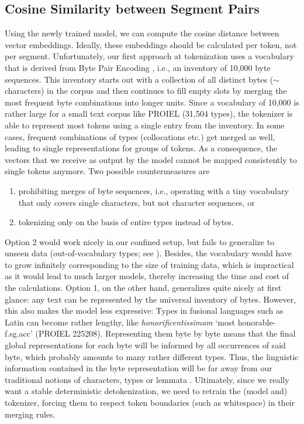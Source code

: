\subsection{Cosine Similarity between Segment Pairs}
Using the newly trained model, we can compute the cosine distance between vector embeddings. Ideally, these embeddings should be calculated per token, not per segment. Unfortunately, our first approach at tokenization uses a vocabulary that is derived from Byte Pair Encoding \parencite[1716]{sennrichNeuralMachineTranslation2016}, i.e., an inventory of 10,000 byte sequences. This inventory starts out with a collection of all distinct bytes ($\sim$ characters) in the corpus and then continues to fill empty slots by merging the most frequent byte combinations into longer units. Since a vocabulary of 10,000 is rather large for a small text corpus like PROIEL (31,504 types), the tokenizer is able to represent most tokens using a single entry from the inventory. In some cases, frequent combinations of types (collocations etc.) get merged as well, leading to single representations for groups of tokens. As a consequence, the vectors that we receive as output by the model cannot be mapped consistently to single tokens anymore. Two possible countermeasures are 
\begin{enumerate}
    \item prohibiting merges of byte sequences, i.e., operating with a tiny vocabulary that only covers single characters, but not character sequences, or
    \item tokenizing only on the basis of entire types instead of bytes.
\end{enumerate}

Option 2 would work nicely in our confined setup, but fails to generalize to unseen data (out-of-vocabulary types; see \cite[57]{paradaSpokenTermDetection2010}). Besides, the vocabulary would have to grow infinitely corresponding to the size of training data, which is impractical as it would lead to much larger models, thereby increasing the time and cost of the calculations. Option 1, on the other hand, generalizes quite nicely at first glance: any text can be represented by the universal inventory of bytes. However, this also makes the model less expressive: Types in fusional languages such as Latin can become rather lengthy, like \textit{honorificentissimam} `most honorable-{\sc f.sg.acc}' (PROIEL 225208). Representing them byte by byte means that the final global representations for each byte will be informed by all occurrences of said byte, which probably amounts to many rather different types. Thus, the linguistic information contained in the byte representation will be far away from our traditional notions of characters, types or lemmata \parencite[1718]{sennrichNeuralMachineTranslation2016}. Ultimately, since we really want a stable deterministic detokenization, we need to retrain the (model and) tokenizer, forcing them to respect token boundaries (such as whitespace) in their merging rules.


